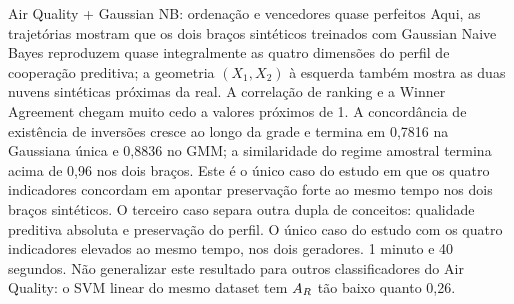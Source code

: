 {\begin{frame}{Air Quality + Gaussian NB: ordenação e vencedores quase perfeitos}
  \speakernotes
    {Aqui, as trajetórias mostram que os dois braços sintéticos treinados com Gaussian Naive Bayes reproduzem quase integralmente as quatro dimensões do perfil de cooperação preditiva; a geometria $(X_1,X_2)$ à esquerda também mostra as duas nuvens sintéticas próximas da real. A correlação de ranking e a Winner Agreement chegam muito cedo a valores próximos de 1. A concordância de existência de inversões cresce ao longo da grade e termina em 0,7816 na Gaussiana única e 0,8836 no GMM; a similaridade do regime amostral termina acima de 0,96 nos dois braços. Este é o único caso do estudo em que os quatro indicadores concordam em apontar preservação forte ao mesmo tempo nos dois braços sintéticos.}
    {O terceiro caso separa outra dupla de conceitos: qualidade preditiva absoluta e preservação do perfil.}
    {O único caso do estudo com os quatro indicadores elevados ao mesmo tempo, nos dois geradores.}
    {1 minuto e 40 segundos.}
    {Não generalizar este resultado para outros classificadores do Air Quality: o SVM linear do mesmo dataset tem $A_R$ tão baixo quanto 0,26.}
\end{frame}}

